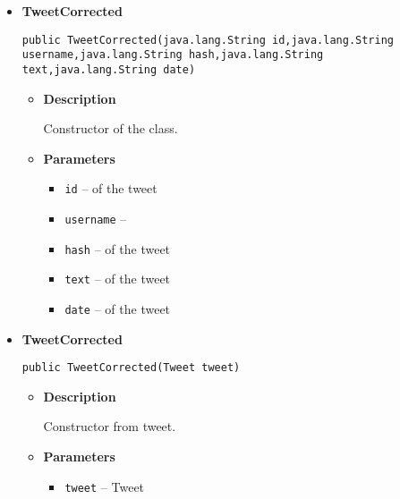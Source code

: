 {{{{{{{{{\begin{itemize}
{\begin{itemize}
{Constructor of the class.
}
\item{
{\bf  Parameters}
  \begin{itemize}
   \item{
\texttt{text} -- of the tweet}
  \end{itemize}
}%
\end{itemize}
}%
\item{ 
\hypertarget{com.jmorenov.tweetsccore.twitter.TweetCorrected(java.lang.String, java.lang.String, java.lang.String, java.lang.String, java.lang.String)}{{\bf  TweetCorrected}\\}
\begin{lstlisting}[frame=none]
public TweetCorrected(java.lang.String id,java.lang.String username,java.lang.String hash,java.lang.String text,java.lang.String date)\end{lstlisting} %
\begin{itemize}
\item{
{\bf  Description}

Constructor of the class.
}
\item{
{\bf  Parameters}
  \begin{itemize}
   \item{
\texttt{id} -- of the tweet}
   \item{
\texttt{username} -- }
   \item{
\texttt{hash} -- of the tweet}
   \item{
\texttt{text} -- of the tweet}
   \item{
\texttt{date} -- of the tweet}
  \end{itemize}
}%
\end{itemize}
}%
\item{ 
\hypertarget{com.jmorenov.tweetsccore.twitter.TweetCorrected(com.jmorenov.tweetsccore.twitter.Tweet)}{{\bf  TweetCorrected}\\}
\begin{lstlisting}[frame=none]
public TweetCorrected(Tweet tweet)\end{lstlisting} %
\begin{itemize}
\item{
{\bf  Description}

Constructor from tweet.
}
\item{
{\bf  Parameters}
  \begin{itemize}
   \item{
\texttt{tweet} -- Tweet}
  \end{itemize}
}%
\end{itemize}
}%
\end{itemize}
}
}}}}}}}}
